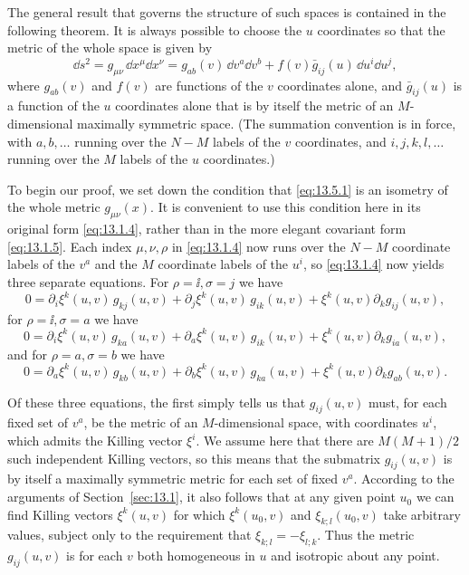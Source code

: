 The general result that governs the structure of such spaces is contained in
the following theorem. It is always possible to choose the \(u\) coordinates
so that the metric of the whole space is given by
\begin{equation}
  \dd s^2
  =
  g_{\mu\nu}\,\dd x^\mu\dd x^\nu
  =
  g_{ab}(v)\,\dd v^a\dd v^b
  +f(v)\bar g_{ij}(u)\,\dd u^i\dd u^j,
  \tag{13.5.4}\label{eq:13.5.4}
\end{equation}
where \(g_{ab}(v)\) and \(f(v)\) are functions of the \(v\) coordinates
alone, and \(\bar g_{ij}(u)\) is a function of the \(u\) coordinates alone
that is by itself the metric of an \(M\)-dimensional maximally symmetric
space. (The summation convention is in force, with \(a,b,\ldots\) running
over the \(N-M\) labels of the \(v\) coordinates, and
\(i,j,k,l,\ldots\) running over the \(M\) labels of the \(u\) coordinates.)

To begin our proof, we set down the condition that \eqref{eq:13.5.1} is an
isometry of the whole metric \(g_{\mu\nu}(x)\). It is convenient to use this
condition here in its original form \eqref{eq:13.1.4}, rather than in the
more elegant covariant form \eqref{eq:13.1.5}. Each index
\(\mu,\nu,\rho\) in \eqref{eq:13.1.4} now runs over the \(N-M\) coordinate
labels of the \(v^a\) and the \(M\) coordinate labels of the \(u^i\), so
\eqref{eq:13.1.4} now yields three separate equations. For
\(\rho=\ii,\sigma=j\) we have
\begin{equation}
  0
  =
  \partial_i\xi^k(u,v)\,g_{kj}(u,v)
  +\partial_j\xi^k(u,v)\,g_{ik}(u,v)
  +\xi^k(u,v)\partial_k g_{ij}(u,v),
  \tag{13.5.5}\label{eq:13.5.5}
\end{equation}
for \(\rho=\ii,\sigma=a\) we have
\begin{equation}
  0
  =
  \partial_i\xi^k(u,v)\,g_{ka}(u,v)
  +\partial_a\xi^k(u,v)\,g_{ik}(u,v)
  +\xi^k(u,v)\partial_k g_{ia}(u,v),
  \tag{13.5.6}\label{eq:13.5.6}
\end{equation}
and for \(\rho=a,\sigma=b\) we have
\begin{equation}
  0
  =
  \partial_a\xi^k(u,v)\,g_{kb}(u,v)
  +\partial_b\xi^k(u,v)\,g_{ka}(u,v)
  +\xi^k(u,v)\partial_k g_{ab}(u,v).
  \tag{13.5.7}\label{eq:13.5.7}
\end{equation}

Of these three equations, the first simply tells us that \(g_{ij}(u,v)\)
must, for each fixed set of \(v^a\), be the metric of an \(M\)-dimensional
space, with coordinates \(u^i\), which admits the Killing vector \(\xi^i\).
We assume here that there are \(M(M+1)/2\) such independent Killing vectors,
so this means that the submatrix \(g_{ij}(u,v)\) is by itself a maximally
symmetric metric for each set of fixed \(v^a\). According to the arguments
of Section~\ref{sec:13.1}, it also follows that at any given point \(u_0\)
we can find Killing vectors \(\xi^k(u,v)\) for which \(\xi^k(u_0,v)\) and
\(\xi_{k;l}(u_0,v)\) take arbitrary values, subject only to the requirement
that \(\xi_{k;l}=-\xi_{l;k}\). Thus the metric \(g_{ij}(u,v)\) is for each
\(v\) both homogeneous in \(u\) and isotropic about any point.

